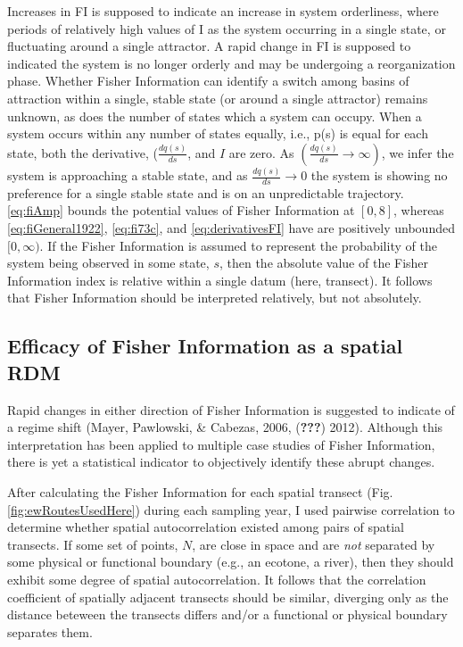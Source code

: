 \documentclass[12pt,twoside,openany]{reedthesis}
\begin{document}
Increases in FI is supposed to indicate an increase in system
orderliness, where periods of relatively high values of I as the system
occurring in a single state, or fluctuating around a single attractor. A
rapid change in FI is supposed to indicated the system is no longer
orderly and may be undergoing a reorganization phase. Whether Fisher
Information can identify a switch among basins of attraction within a
single, stable state (or around a single attractor) remains unknown, as
does the number of states which a system can occupy. When a system
occurs within any number of states equally, i.e., p(s) is equal for each
state, both the derivative, (\(\frac{dq(s)}{ds}\), and \(I\) are zero.
As \((\frac{dq(s)}{ds} \rightarrow \infty)\), we infer the system is
approaching a stable state, and as \(\frac{dq(s)}{ds} \rightarrow 0\)
the system is showing no preference for a single stable state and is on
an unpredictable trajectory. \eqref{eq:fiAmp} bounds the potential values
of Fisher Information at \([0, 8]\), whereas \eqref{eq:fiGeneral1922},
\eqref{eq:fi73c}, and \eqref{eq:derivativesFI} have are positively unbounded
\([0, \infty)\). If the Fisher Information is assumed to represent the
probability of the system being observed in some state, \(s\), then the
absolute value of the Fisher Information index is relative within a
single datum (here, transect). It follows that Fisher Information should
be interpreted relatively, but not absolutely.

\subsection{Efficacy of Fisher Information as a spatial
RDM}\label{efficacy-of-fisher-information-as-a-spatial-rdm}

Rapid changes in either direction of Fisher Information is suggested to
indicate of a regime shift (Mayer, Pawlowski, \& Cabezas, 2006,
({\textbf{???}}) 2012). Although this interpretation has been applied to
multiple case studies of Fisher Information, there is yet a statistical
indicator to objectively identify these abrupt changes.

After calculating the Fisher Information for each spatial transect (Fig.
\ref{fig:ewRoutesUsedHere}) during each sampling year, I used pairwise
correlation to determine whether spatial autocorrelation existed among
pairs of spatial transects. If some set of points, \(N\), are close in
space and are \emph{not} separated by some physical or functional
boundary (e.g., an ecotone, a river), then they should exhibit some
degree of spatial autocorrelation. It follows that the correlation
coefficient of spatially adjacent transects should be similar, diverging
only as the distance beteween the transects differs and/or a functional
or physical boundary separates them.
\end{document}
